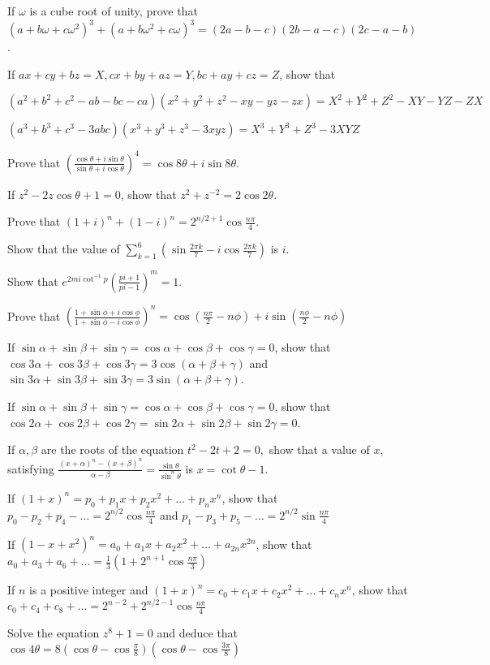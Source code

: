 \item If $\omega$ is a cube root of unity, prove that $(a + b\omega + c\omega^2)^3 + (a + b\omega^2 + c\omega)^3 = (2a - b - c)(2b
  - a - c)(2c - a - b)$.
\item If $ax + cy + bz = X, cx + by + az = Y, bc + ay + cz = Z$, show that
  \startitemize[i]
  \item $(a^2 + b^2 + c^2 - ab - bc - ca)(x^2 + y^2 + z^2 - xy - yz - zx) = X^2 + Y^2 + Z^2 - XY - YZ - ZX$
  \item $(a^3 + b^3 + c^3 - 3abc)(x^3 + y^3 + z^3 - 3xyz) = X^3 + Y^3 + Z^3 - 3XYZ$
  \stopitemize
\item Prove that $\left(\frac{\cos\theta + i\sin\theta}{\sin\theta + i\cos\theta}\right)^4 = \cos8\theta + i\sin8\theta$.
\item If $z^2 - 2z\cos\theta + 1 = 0$, show that $z^2 + z^{-2} = 2\cos2\theta$.
\item Prove that $(1 + i)^n + (1 - i)^n = 2^{n/2 + 1}\cos\frac{n\pi}{4}$.
\item Show that the value of $\displaystyle\sum_{k = 1}^6\left(\sin\frac{2\pi k}{7} - i\cos\frac{2\pi
  k}{7}\right)$ is $i$.
\item Show that $e^{2mi\cot^{-1}p}\left(\frac{pi + 1}{pi - 1}\right)^m = 1$.
\item Prove that $\left(\frac{1 + \sin\phi + i\cos\phi}{1 + \sin\phi - i\cos\phi}\right)^n = \cos\left(\frac{n\pi}{2} -
  n\phi\right) + i\sin\left(\frac{n\phi}{2} - n\phi\right)$
\item If $\sin\alpha + \sin\beta + \sin\gamma = \cos\alpha + \cos\beta + \cos\gamma = 0$, show that $\cos3\alpha + \cos3\beta +
  \cos3\gamma = 3\cos(\alpha + \beta + \gamma)$ and $\sin3\alpha + \sin3\beta + \sin3\gamma = 3\sin(\alpha + \beta + \gamma)$.
\item If $\sin\alpha + \sin\beta + \sin\gamma = \cos\alpha + \cos\beta + \cos\gamma = 0$, show that $\cos2\alpha + \cos2\beta +
  \cos2\gamma = \sin2\alpha + \sin2\beta + \sin2\gamma = 0$.
\item If $\alpha, \beta$ are the roots of the equation $t^2 - 2t + 2 = 0,$ show that a value of $x$, satisfying $\frac{(x +
  \alpha)^n - (x + \beta)^n}{\alpha - \beta} = \frac{\sin\theta}{\sin^n\theta}$ is $x = \cot\theta - 1$.
\item If $(1 + x)^n = p_0 + p_1x + p_2x^2 + \ldots + p_nx^n$, show that $p_0 - p_2 + p_4 - \ldots = 2^{n/2}\cos\frac{n\pi}{4}$ and
  $p_1 - p_3 + p_5 - \ldots = 2^{n/2}\sin\frac{n\pi}{4}$
\item If $(1 - x + x^2)^n = a_0 + a_1x + a_2x^2 + \ldots + a_{2n}x^{2n}$, show that $a_0 + a_3 + a_6 + \ldots = \frac{1}{3}\left(1
  + 2^{n + 1}\cos\frac{n\pi}{3}\right)$
\item If $n$ is a positive integer and $(1 + x)^n = c_0 + c_1x + c_2x^2 + \ldots + c_nx^n$, show that $c_0 + c_4 + c_8 + \ldots =
  2^{n - 2} + 2^{n/2 - 1}\cos\frac{n\pi}{4}$
\item Solve the equation $z^8 + 1= 0$ and deduce that $\cos4\theta = 8\left(\cos\theta - \cos\frac{\pi}{8}\right)\left(\cos\theta -
  \cos\frac{3\pi}{8}\right)$

